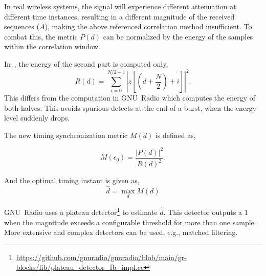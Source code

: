 In real wireless systems, the signal will experience different attenuation at different time instances, resulting in a different magnitude of the received sequences ($A$), making the above referenced correlation method insufficient. To combat this, the metric $P(d)$ can be normalized by the energy of the samples within the correlation window.

In~\cite{650240}, the energy of the second part is computed only,
\begin{equation*} 
                R(d) = \sum_{i=0}^{N/2-1} \left|z\left[\left(d+\frac{N}{2}\right)+ i\right]\right|^2.
\end{equation*}
This differs from the computation in GNU~Radio which computes the energy of both halves. This avoids spurious detects at the end of a burst, when the energy level suddenly drops.

The new timing synchronization metric $M(d)$ is defined as,

\begin{equation}\label{eqOFDMmd} 
        M(\epsilon_0) = \frac{|P(d)|^2}{R(d)^2}.
\end{equation}

And the optimal timing instant is given as,
\begin{equation}\label{eqOFDMoptimalTiming} 
        \hat d = \max _{d} M(d) 
\end{equation}

GNU~Radio uses a plateau detector\footnote{\url{https://github.com/gnuradio/gnuradio/blob/main/gr-blocks/lib/plateau_detector_fb_impl.cc}} to estimate $\hat d$. This detector outputs a $1$ when the magnitude exceeds a configurable threshold for more than one sample. More extensive and complex detectors can be used, e.g., matched filtering.




